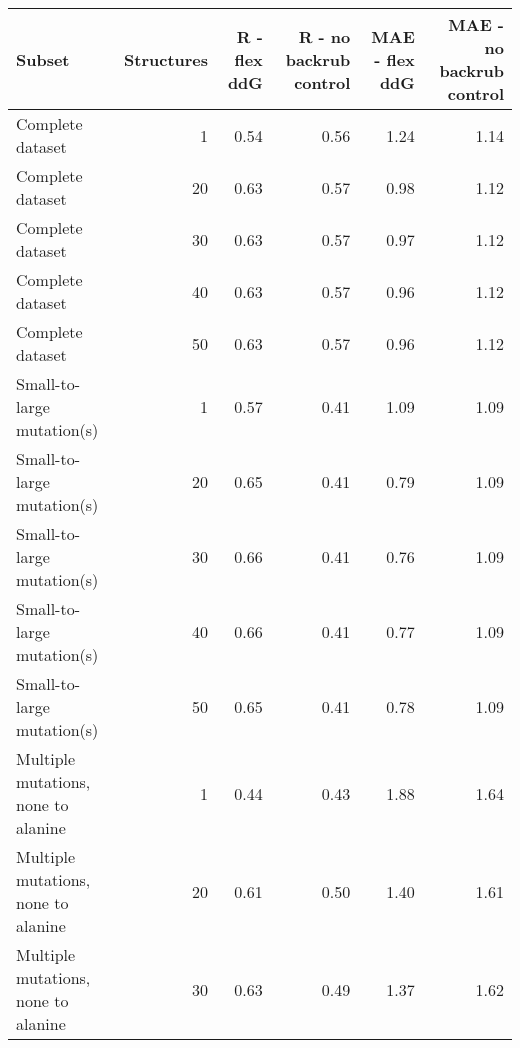\begin{table}
\begin{tabular}{lrrrrr}
\toprule
                              Subset &  Structures &  R - flex ddG &  R - no backrub control &  MAE - flex ddG &  MAE - no backrub control \\
\midrule
                    Complete dataset &           1 &          0.54 &                    0.56 &            1.24 &                      1.14 \\
                    Complete dataset &          20 &          0.63 &                    0.57 &            0.98 &                      1.12 \\
                    Complete dataset &          30 &          0.63 &                    0.57 &            0.97 &                      1.12 \\
                    Complete dataset &          40 &          0.63 &                    0.57 &            0.96 &                      1.12 \\
                    Complete dataset &          50 &          0.63 &                    0.57 &            0.96 &                      1.12 \\
          Small-to-large mutation(s) &           1 &          0.57 &                    0.41 &            1.09 &                      1.09 \\
          Small-to-large mutation(s) &          20 &          0.65 &                    0.41 &            0.79 &                      1.09 \\
          Small-to-large mutation(s) &          30 &          0.66 &                    0.41 &            0.76 &                      1.09 \\
          Small-to-large mutation(s) &          40 &          0.66 &                    0.41 &            0.77 &                      1.09 \\
          Small-to-large mutation(s) &          50 &          0.65 &                    0.41 &            0.78 &                      1.09 \\
 Multiple mutations, none to alanine &           1 &          0.44 &                    0.43 &            1.88 &                      1.64 \\
 Multiple mutations, none to alanine &          20 &          0.61 &                    0.50 &            1.40 &                      1.61 \\
 Multiple mutations, none to alanine &          30 &          0.63 &                    0.49 &            1.37 &                      1.62 \\

\end{tabular}
\end{table}
